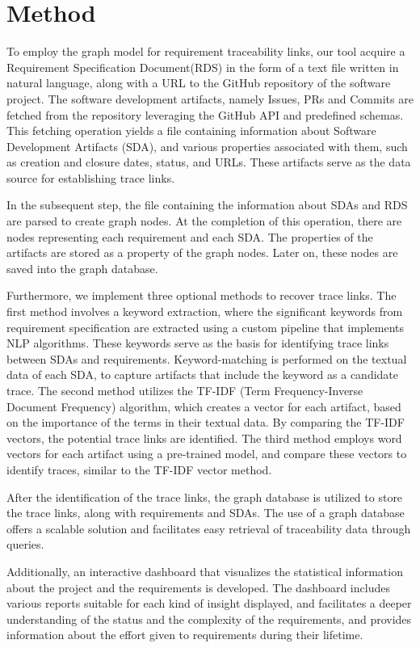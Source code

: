 \documentclass[conference]{IEEEtran}
\begin{document}
\section{Method}
\label{section:method}

To employ the graph model for requirement traceability links, our tool acquire a Requirement Specification Document(RDS) in the form of a text file written in natural language, along with a URL to the GitHub repository of the software project. The software development artifacts, namely Issues, PRs and Commits are fetched from the repository leveraging the GitHub API and predefined schemas. This fetching operation yields a file containing information about Software Development Artifacts (SDA), and various properties associated with them, such as creation and closure dates, status, and URLs. These artifacts serve as the data source for establishing trace links.

In the subsequent step, the file containing the information about SDAs and RDS are parsed to create graph nodes. At the completion of this operation, there are nodes representing each requirement and each SDA. The properties of the artifacts are stored as a property of the graph nodes. Later on, these nodes are saved into the graph database.

Furthermore, we implement three optional methods to recover trace links. The first method involves a keyword extraction, where the significant keywords from requirement specification are extracted using a custom pipeline that implements NLP algorithms. These keywords serve as the basis for identifying trace links between SDAs and requirements. Keyword-matching is performed on the textual data of each SDA, to capture artifacts that include the keyword as a candidate trace. The second method utilizes the TF-IDF (Term Frequency-Inverse Document Frequency) algorithm, which creates a vector for each artifact, based on the importance of the terms in their textual data. By comparing the TF-IDF vectors, the potential trace links are identified. The third method employs word vectors for each artifact using a pre-trained model, and compare these vectors to identify traces, similar to the TF-IDF vector method. 

After the identification of the trace links, the graph database is utilized to store the trace links, along with requirements and SDAs. The use of a graph database offers a scalable solution and facilitates easy retrieval of traceability data through queries. 

Additionally, an interactive dashboard that visualizes the statistical information about the project and the requirements is developed. The dashboard includes various reports suitable for each kind of insight displayed, and facilitates a deeper understanding of the status and the complexity of the requirements, and provides information about the effort given to requirements during their lifetime.
\end{document}
